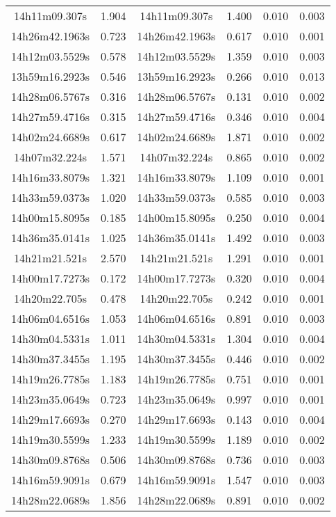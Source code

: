 \begin{table}
\begin{tabular}{cccccc}
14h11m09.307s & 1.904 & 14h11m09.307s & 1.400 & 0.010 & 0.003 \\
14h26m42.1963s & 0.723 & 14h26m42.1963s & 0.617 & 0.010 & 0.001 \\
14h12m03.5529s & 0.578 & 14h12m03.5529s & 1.359 & 0.010 & 0.003 \\
13h59m16.2923s & 0.546 & 13h59m16.2923s & 0.266 & 0.010 & 0.013 \\
14h28m06.5767s & 0.316 & 14h28m06.5767s & 0.131 & 0.010 & 0.002 \\
14h27m59.4716s & 0.315 & 14h27m59.4716s & 0.346 & 0.010 & 0.004 \\
14h02m24.6689s & 0.617 & 14h02m24.6689s & 1.871 & 0.010 & 0.002 \\
14h07m32.224s & 1.571 & 14h07m32.224s & 0.865 & 0.010 & 0.002 \\
14h16m33.8079s & 1.321 & 14h16m33.8079s & 1.109 & 0.010 & 0.001 \\
14h33m59.0373s & 1.020 & 14h33m59.0373s & 0.585 & 0.010 & 0.003 \\
14h00m15.8095s & 0.185 & 14h00m15.8095s & 0.250 & 0.010 & 0.004 \\
14h36m35.0141s & 1.025 & 14h36m35.0141s & 1.492 & 0.010 & 0.003 \\
14h21m21.521s & 2.570 & 14h21m21.521s & 1.291 & 0.010 & 0.001 \\
14h00m17.7273s & 0.172 & 14h00m17.7273s & 0.320 & 0.010 & 0.004 \\
14h20m22.705s & 0.478 & 14h20m22.705s & 0.242 & 0.010 & 0.001 \\
14h06m04.6516s & 1.053 & 14h06m04.6516s & 0.891 & 0.010 & 0.003 \\
14h30m04.5331s & 1.011 & 14h30m04.5331s & 1.304 & 0.010 & 0.004 \\
14h30m37.3455s & 1.195 & 14h30m37.3455s & 0.446 & 0.010 & 0.002 \\
14h19m26.7785s & 1.183 & 14h19m26.7785s & 0.751 & 0.010 & 0.001 \\
14h23m35.0649s & 0.723 & 14h23m35.0649s & 0.997 & 0.010 & 0.001 \\
14h29m17.6693s & 0.270 & 14h29m17.6693s & 0.143 & 0.010 & 0.004 \\
14h19m30.5599s & 1.233 & 14h19m30.5599s & 1.189 & 0.010 & 0.002 \\
14h30m09.8768s & 0.506 & 14h30m09.8768s & 0.736 & 0.010 & 0.003 \\
14h16m59.9091s & 0.679 & 14h16m59.9091s & 1.547 & 0.010 & 0.003 \\
14h28m22.0689s & 1.856 & 14h28m22.0689s & 0.891 & 0.010 & 0.002 \\

\end{tabular}
\end{table}
